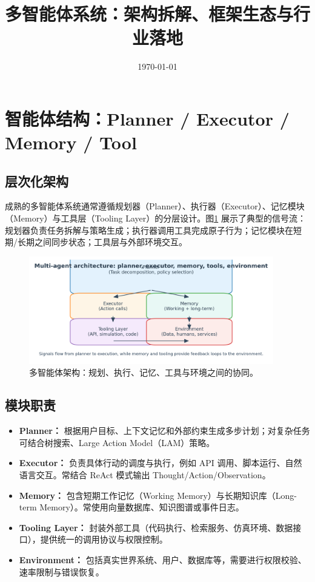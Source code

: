 \documentclass[UTF8,zihao=-4]{ctexart}
\title{多智能体系统：架构拆解、框架生态与行业落地}
\author{}
\date{\today}
\begin{document}
\maketitle

\section{智能体结构：Planner / Executor / Memory / Tool}
\subsection{层次化架构}
成熟的多智能体系统通常遵循规划器（Planner）、执行器（Executor）、记忆模块（Memory）与工具层（Tooling Layer）的分层设计。图\ref{fig:multi_agent_architecture} 展示了典型的信号流：规划器负责任务拆解与策略生成；执行器调用工具完成原子行为；记忆模块在短期/长期之间同步状态；工具层与外部环境交互。
\begin{figure}[H]
  \centering
  \includegraphics[width=0.95\textwidth]{multi_agent_architecture.png}
  \caption{多智能体架构：规划、执行、记忆、工具与环境之间的协同。}
  \label{fig:multi_agent_architecture}
\end{figure}

\subsection{模块职责}
\begin{itemize}
  \item \textbf{Planner：} 根据用户目标、上下文记忆和外部约束生成多步计划；对复杂任务可结合树搜索、Large Action Model（LAM）策略。
  \item \textbf{Executor：} 负责具体行动的调度与执行，例如 API 调用、脚本运行、自然语言交互。常结合 ReAct 模式输出 Thought/Action/Observation。
  \item \textbf{Memory：} 包含短期工作记忆（Working Memory）与长期知识库（Long-term Memory）。常使用向量数据库、知识图谱或事件日志。
  \item \textbf{Tooling Layer：} 封装外部工具（代码执行、检索服务、仿真环境、数据接口），提供统一的调用协议与权限控制。
  \item \textbf{Environment：} 包括真实世界系统、用户、数据库等，需要进行权限校验、速率限制与错误恢复。
\end{itemize}
\end{document}
